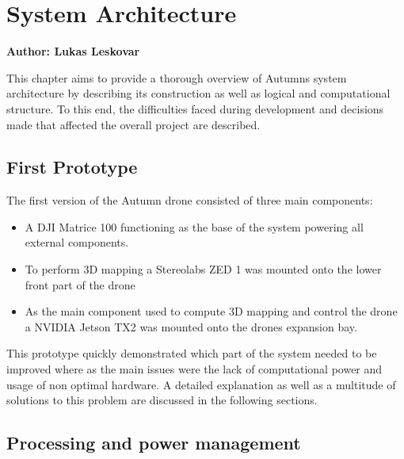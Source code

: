 \chapter{System Architecture}

\textbf{Author: Lukas Leskovar} 

This chapter aims to provide a thorough overview of Autumns system architecture by describing its construction as well as logical and computational  structure. To this end, the difficulties faced during development and decisions made that affected the overall project are described.

\section{First Prototype}
The first version of the Autumn drone consisted of three main components:
\begin{itemize}
	\item A DJI Matrice 100 functioning as the base of the system powering all external components.
	\item To perform 3D mapping a Stereolabs ZED 1 was mounted onto the lower front part of the drone
	\item As the main component used to compute 3D mapping and control the drone a NVIDIA Jetson TX2 was mounted onto the drones expansion bay.
\end{itemize}
This prototype quickly demonstrated which part of the system needed to be improved where as the main issues were the lack of computational power and usage of non optimal hardware. A detailed explanation as well as a multitude of solutions to this problem are discussed in the following sections.


\section{Processing and power management}


